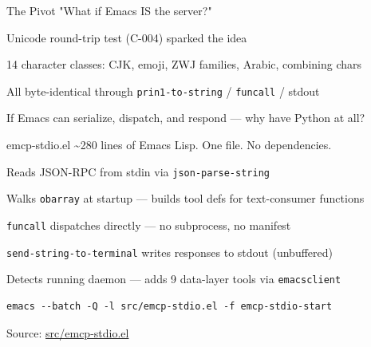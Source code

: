 \documentclass[presentation]{beamer}
\begin{document}
\begin{frame}[label={sec:org7f89871},fragile]{The Pivot}
 "What if Emacs IS the server?"
\begin{block}{Unicode round-trip test (C-004) sparked the idea}
\end{block}
\begin{block}{14 character classes: CJK, emoji, ZWJ families, Arabic, combining chars}
\end{block}
\begin{block}{All byte-identical through \texttt{prin1-to-string} / \texttt{funcall} / stdout}
\end{block}
\begin{block}{If Emacs can serialize, dispatch, and respond --- why have Python at all?}
\end{block}
\end{frame}
\begin{frame}[label={sec:orga0d5e9d},fragile]{emcp-stdio.el}
 \textasciitilde{}280 lines of Emacs Lisp. One file. No dependencies.
\begin{block}{Reads JSON-RPC from stdin via \texttt{json-parse-string}}
\end{block}
\begin{block}{Walks \texttt{obarray} at startup --- builds tool defs for text-consumer functions}
\end{block}
\begin{block}{\texttt{funcall} dispatches directly --- no subprocess, no manifest}
\end{block}
\begin{block}{\texttt{send-string-to-terminal} writes responses to stdout (unbuffered)}
\end{block}
\begin{block}{Detects running daemon --- adds 9 data-layer tools via \texttt{emacsclient}}
\begin{verbatim}
emacs --batch -Q -l src/emcp-stdio.el -f emcp-stdio-start
\end{verbatim}

Source: \href{../../../src/emcp-stdio.el}{src/emcp-stdio.el}
\end{block}
\end{frame}
\end{document}
